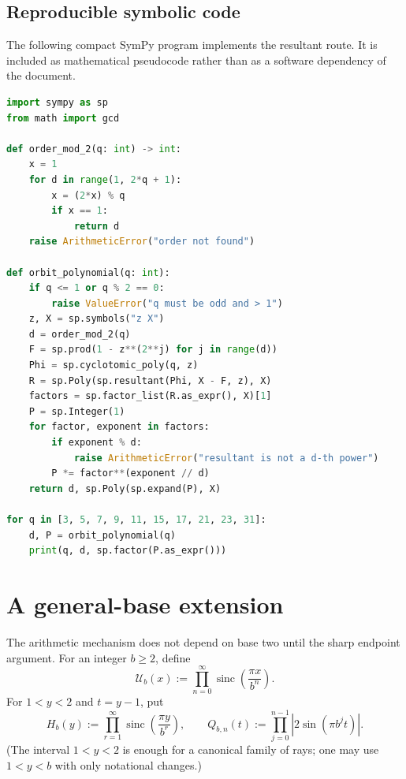 \documentclass[11pt,oneside]{article}
\theoremstyle{definition}
\theoremstyle{remark}
\newcommand{\sinc}{\operatorname{sinc}}
\begin{document}
\subsection{Reproducible symbolic code}

The following compact SymPy program implements the resultant route. It is included
as mathematical pseudocode rather than as a software dependency of the document.

\begin{lstlisting}[style=pseudo,language=Python,caption={Orbit-polynomial computation.}]
import sympy as sp
from math import gcd

def order_mod_2(q: int) -> int:
    x = 1
    for d in range(1, 2*q + 1):
        x = (2*x) % q
        if x == 1:
            return d
    raise ArithmeticError("order not found")

def orbit_polynomial(q: int):
    if q <= 1 or q % 2 == 0:
        raise ValueError("q must be odd and > 1")
    z, X = sp.symbols("z X")
    d = order_mod_2(q)
    F = sp.prod(1 - z**(2**j) for j in range(d))
    Phi = sp.cyclotomic_poly(q, z)
    R = sp.Poly(sp.resultant(Phi, X - F, z), X)
    factors = sp.factor_list(R.as_expr(), X)[1]
    P = sp.Integer(1)
    for factor, exponent in factors:
        if exponent % d:
            raise ArithmeticError("resultant is not a d-th power")
        P *= factor**(exponent // d)
    return d, sp.Poly(sp.expand(P), X)

for q in [3, 5, 7, 9, 11, 15, 17, 21, 23, 31]:
    d, P = orbit_polynomial(q)
    print(q, d, sp.factor(P.as_expr()))
\end{lstlisting}

\section{A general-base extension}\label{p2:sec:general-base}

The arithmetic mechanism does not depend on base two until the sharp endpoint
argument. For an integer $b\ge2$, define
\begin{equation}
 \mathscr U_b(x):=\prod_{n=0}^{\infty}
 \sinc\!\left(\frac{\pi x}{b^n}\right).
 \label{p2:eq:Ub}
\end{equation}
For $1<y<2$ and $t=y-1$, put
\begin{equation}
 H_b(y):=\prod_{r=1}^{\infty}\sinc\!\left(\frac{\pi y}{b^r}\right),
 \qquad
 Q_{b,n}(t):=\prod_{j=0}^{n-1}|2\sin(\pi b^jt)|.
 \label{p2:eq:Hb-Qb}
\end{equation}
(The interval $1<y<2$ is enough for a canonical family of rays; one may use
$1<y<b$ with only notational changes.)
\end{document}
